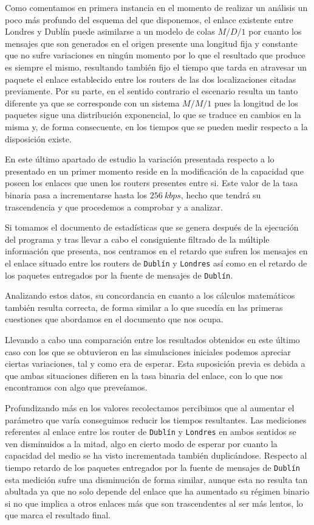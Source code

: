 \documentclass{article}[10pt]
\begin{document}
		Como comentamos en primera instancia en el momento de realizar un análisis un poco más profundo del esquema del que disponemos, el enlace existente entre Londres y Dublín puede asimilarse a un modelo de colas $M/D/1$ por cuanto los mensajes que son generados en el origen presente una longitud fija y constante que no sufre variaciones en ningún momento por lo que el resultado que produce es siempre el mismo, resultando también fijo el tiempo que tarda en atravesar un paquete el enlace establecido entre los routers de las dos localizaciones citadas previamente. Por su parte, en el sentido contrario el escenario resulta un tanto diferente ya que se corresponde con un sistema $M/M/1$ pues la longitud de los paquetes sigue una distribución exponencial, lo que se traduce en cambios en la misma y, de forma consecuente, en los tiempos que se pueden medir respecto a la disposición existe.

		En este último apartado de estudio la variación presentada respecto a lo presentado en un primer momento reside en la modificación de la capacidad que poseen los enlaces que unen los routers presentes entre si. Este valor de la tasa binaria pasa a incrementarse hasta los $256\ kbps$, hecho que tendrá su trascendencia y que procedemos a comprobar y a analizar.

		Si tomamos el documento de estadísticas que se genera después de la ejecución del programa y tras llevar a cabo el consiguiente filtrado de la múltiple información que presenta, nos centramos en el retardo que sufren los mensajes en el enlace situado entre los routers de \texttt{Dublín} y \texttt{Londres} así como en el retardo de los paquetes entregados por la fuente de mensajes de \texttt{Dublín}.

		Analizando estos datos, su concordancia en cuanto a los cálculos matemáticos también resulta correcta, de forma similar a lo que sucedía en las primeras cuestiones que abordamos en el documento que nos ocupa.

		Llevando a cabo una comparación entre los resultados obtenidos en este último caso con los que se obtuvieron en las simulaciones iniciales podemos apreciar ciertas variaciones, tal y como era de esperar. Esta suposición previa es debida a que ambas situaciones difieren en la tasa binaria del enlace, con lo que nos encontramos con algo que preveíamos.

		Profundizando más en los valores recolectamos percibimos que al aumentar el parámetro que varía conseguimos reducir los tiempos resultantes. Las mediciones referentes al enlace entre los router de \texttt{Dublín} y \texttt{Londres} en ambos sentidos se ven disminuidos a la mitad, algo en cierto modo de esperar por cuanto la capacidad del medio se ha visto incrementada también duplicándose. Respecto al tiempo retardo de los paquetes entregados por la fuente de mensajes de \texttt{Dublín} esta medición sufre una disminución de forma similar, aunque esta no resulta tan abultada ya que no solo depende del enlace que ha aumentado su régimen binario si no que implica a otros enlaces más que son trascendentes al ser más lentos, lo que marca el resultado final.
\end{document}
